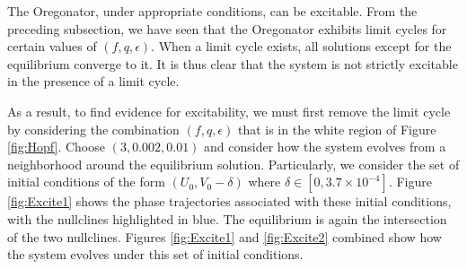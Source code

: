 \documentclass[twocolumn,amsmath,amssymb,aps]{revtex4}
\begin{document}
The Oregonator, under appropriate conditions, can be excitable. From the preceding subsection, we have seen that the Oregonator exhibits limit cycles for certain values of $(f,q,\epsilon)$. When a limit cycle exists, all solutions except for the equilibrium converge to it. It is thus clear that the system is not strictly excitable in the presence of a limit cycle. 

As a result, to find evidence for excitability, we must first remove the limit cycle by considering the combination $(f,q,\epsilon)$ that is in the white region of Figure \ref{fig:Hopf}. Choose $(3,0.002, 0.01)$ and consider how the system evolves from a neighborhood around the equilibrium solution. Particularly, we consider the set of initial conditions of the form $(U_0, V_0 - \delta)$ where $\delta \in [0, 3.7\times 10^{-4}]$. Figure \ref{fig:Excite1} shows the phase trajectories associated with these initial conditions, with the nullclines highlighted in blue. The equilibrium is again the intersection of the two nullclines. Figures \ref{fig:Excite1} and \ref{fig:Excite2} combined show how the system evolves under this set of initial conditions.
\end{document}
